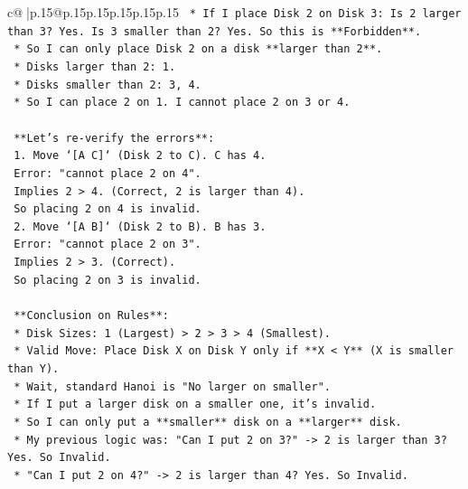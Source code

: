 \documentclass{article}
\begin{document}
{\begin{supertabular}{c@{$\;$}|p{.15\linewidth}@{}p{.15\linewidth}p{.15\linewidth}p{.15\linewidth}p{.15\linewidth}p{.15\linewidth}}
{{{\texttt{                *   If I place Disk 2 on Disk 3: Is 2 larger than 3? Yes. Is 3 smaller than 2? Yes. So this is **Forbidden**.} \\
\texttt{                *   So I can only place Disk 2 on a disk **larger than 2**.} \\
\texttt{                *   Disks larger than 2: 1.} \\
\texttt{                *   Disks smaller than 2: 3, 4.} \\
\texttt{                *   So I can place 2 on 1. I cannot place 2 on 3 or 4.} \\
\\ 
\texttt{                **Let's re{-}verify the errors**:} \\
\texttt{                1. Move `{[}A C{]}` (Disk 2 to C). C has 4.} \\
\texttt{                   Error: "cannot place 2 on 4".} \\
\texttt{                   Implies 2 > 4. (Correct, 2 is larger than 4).} \\
\texttt{                   So placing 2 on 4 is invalid.} \\
\texttt{                2. Move `{[}A B{]}` (Disk 2 to B). B has 3.} \\
\texttt{                   Error: "cannot place 2 on 3".} \\
\texttt{                   Implies 2 > 3. (Correct).} \\
\texttt{                   So placing 2 on 3 is invalid.} \\
\\ 
\texttt{                **Conclusion on Rules**:} \\
\texttt{                *   Disk Sizes: 1 (Largest) > 2 > 3 > 4 (Smallest).} \\
\texttt{                *   Valid Move: Place Disk X on Disk Y only if **X < Y** (X is smaller than Y).} \\
\texttt{                *   Wait, standard Hanoi is "No larger on smaller".} \\
\texttt{                *   If I put a larger disk on a smaller one, it's invalid.} \\
\texttt{                *   So I can only put a **smaller** disk on a **larger** disk.} \\
\texttt{                *   My previous logic was: "Can I put 2 on 3?" {-}> 2 is larger than 3? Yes. So Invalid.} \\
\texttt{                *   "Can I put 2 on 4?" {-}> 2 is larger than 4? Yes. So Invalid.} \\
}}}
\end{supertabular}}
\end{document}
